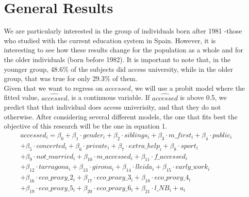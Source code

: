 \documentclass[12pt]{article}
\begin{document}
\section{General Results}

We are particularly interested in the group of individuals born after 1981 -those who studied with the current education system in Spain. However, it is interesting to see how these results change for the population as a whole and for the older individuals (born before 1982). It is important to note that, in the younger group, 48.6\% of the subjects did access university, while in the older group, that was true for only 29.3\% of them. \\
Given that we want to regress on $accessed$, we will use a probit model where the fitted value, $\widehat{accessed}$, is a continuous variable. If $\widehat{accessed}$ is above 0.5, we predict that that individual does access univerisity, and that they do not otherwise. After considering several different models, the one that fits best the objective of this research will be the one in equation 1.
\begin{align}
accessed_i = \beta_0 + \beta_1 \cdot gender_i + \beta_2  \cdot siblings_i + \beta_3 \cdot m\_{first}_i + \beta_4 \cdot public_i \nonumber \\
 + \beta_5 \cdot concerted_i + \beta_6 \cdot private_i + \beta_7 \cdot extra\_{help}_i + \beta_8 \cdot sport_i \nonumber \\
 + \beta_9 \cdot not\_{married}_i + \beta_{10} \cdot m\_{accessed}_i + \beta_{11} \cdot f\_{accessed}_i \nonumber \\
 + \beta_{12} \cdot tarragona_i + \beta_{13} \cdot girona_i + \beta_{14} \cdot lleida_i + \beta_{15} \cdot early\_{work}_i \\
 + \beta_{16} \cdot eco\_{proxy}\_{2}_i + \beta_{17} \cdot eco\_{proxy}\_{3}_i + \beta_{18} \cdot eco\_{proxy}\_{4}_i \nonumber \\
 + \beta_{19} \cdot eco\_{proxy}\_{5}_i + \beta_{20} \cdot eco\_{proxy}\_{6}_i + \beta_{21} \cdot l\_{NB}_i + u_i \nonumber
\end{align}
\end{document}
